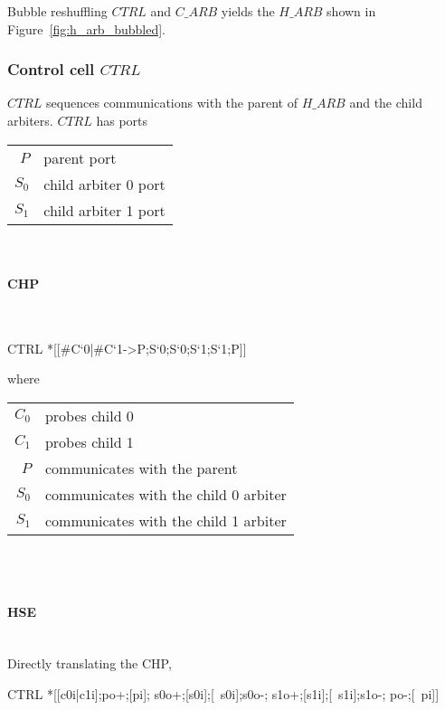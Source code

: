\documentclass[aer.tex]{subfiles}
\begin{document}
\noindent Bubble reshuffling $CTRL$ and $C\_ARB$ yields the $H\!\_ARB$ shown in Figure~\ref{fig:h_arb_bubbled}.

\subsubsection{Control cell $CTRL$}
$CTRL$ sequences communications with the parent of $H\!\_ARB$ and the child arbiters.
$CTRL$ has ports

\begin{tabular}[]{rl}
$P$ & parent port \\
$S_0$ & child arbiter 0 port \\
$S_1$ & child arbiter 1 port \\
\end{tabular} \\

\paragraph{CHP}\mbox{}\\

\begin{csp}
CTRL\equiv
  *[[#{C`0}|#{C`1}->P;S`0;S`0;S`1;S`1;P]]
\end{csp}

\noindent where 

\begin{tabular}[]{rl}
  $C_0$ & probes child 0 \\
  $C_1$ & probes child 1 \\
  $P$ & communicates with the parent \\
  $S_0$ & communicates with the child 0 arbiter \\
  $S_1$ & communicates with the child 1 arbiter \\
\end{tabular} \\ \\

\paragraph{HSE}\mbox{}\\

\noindent Directly translating the CHP,

\begin{hse}
CTRL\equiv
  *[[c0i|c1i];po+;[pi];
    s0o+;[s0i];[~s0i];s0o-;
    s1o+;[s1i];[~s1i];s1o-;
    po-;[~pi]]
\end{hse}
\end{document}
